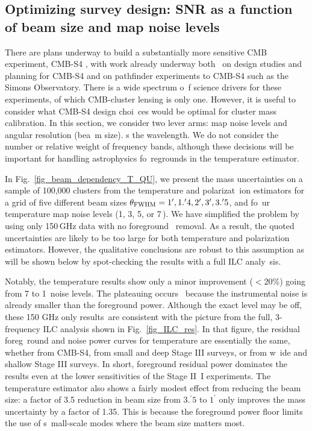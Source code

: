 \subsection{Optimizing survey design: SNR as a function of beam size and map noise levels}
\label{sec_beam_dependence}

There are plans underway to build a substantially more sensitive CMB experiment, CMB-S4 \citep{cmbs4_2016}, with work already underway both \
on design studies and planning for CMB-S4 and on pathfinder experiments to CMB-S4 such as the Simons Observatory. There is a wide spectrum o\
f science drivers for these experiments, of which CMB-cluster lensing is only one. However, it is useful to consider what CMB-S4 design choi\
ces would be optimal for cluster mass calibration. In this section, we consider two lever arms: map noise levels and angular resolution (bea\
m size). %
s the wavelength.                                                                                                                            
We do not consider the number or relative weight of frequency bands, although these decisions will be important for handling astrophysics fo\
regrounds in the temperature estimator.

In Fig.~\ref{fig_beam_dependency_T_QU}, we present the mass uncertainties on a sample of 100,000 clusters from the temperature and polarizat\
ion estimators for a grid of five different beam sizes $\theta_{{\rm FWHM}} = 1^\prime, 1.^\prime4, 2^\prime, 3^\prime, 3.^\prime 5$, and fo\
ur temperature map noise levels (1, 3, 5, or 7\,\ukarcmin{}). We have simplified the problem by using only 150\,GHz data with no foreground \
removal. As a result, the quoted uncertainties are likely to be too large for both temperature and polarization estimators.
However, the qualitative conclusions are robust to this assumption as will be shown below by spot-checking the results with a full ILC analy\
sis.

Notably, the temperature results show only a minor improvement ($<20$\%) going from 7 to 1\,\ukarcmin{} noise levels. The plateauing occurs \
because the instrumental noise is already smaller than the foreground power. Although the exact level may be off, these 150 GHz only results\
 are consistent with the picture from the full, 3-frequency ILC analysis shown in Fig.~\ref{fig_ILC_res}. In that figure, the residual foreg\
round and noise power curves for temperature are essentially the same, whether from CMB-S4, from small and deep Stage III surveys, or from w\
ide and shallow Stage III surveys. In short, foreground residual power dominates the results even at the lower sensitivities of the Stage II\
I experiments.
The temperature estimator also shows a fairly modest effect from reducing the beam size: a factor of 3.5 reduction in beam size from $3.^\prime5$ to $1^\prime$ only improves the mass uncertainty by a factor of 1.35. This is because the foreground power floor   limits the use of s\
mall-scale modes where the beam size matters most.

